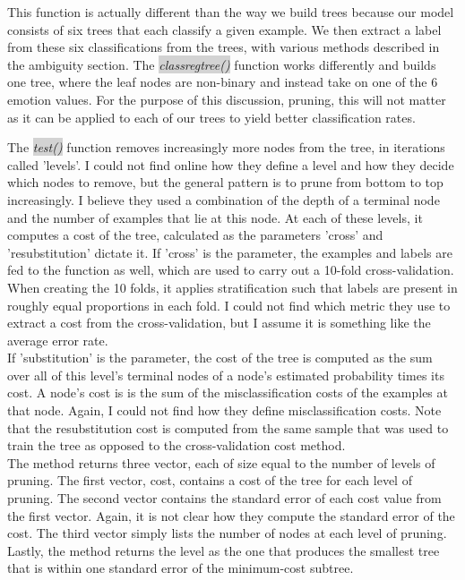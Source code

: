 This function is actually different than the way we build trees because our model consists of six trees that each classify a given
example.
We then extract a label from these six classifications from the trees, with various methods described in the ambiguity section.
The  \colorbox{lightgray}{\emph{classregtree()}} function works differently and builds one tree,
where the leaf nodes are non-binary and instead take on one of the 6 emotion values.
For the purpose of this discussion, pruning,
this will not matter as it can be applied to each of our trees to yield better classification rates.

The  \colorbox{lightgray}{\emph{test()}} function removes increasingly more nodes from the tree, in iterations called 'levels'.
I could not find online how they define a level and how they decide which nodes to remove,
but the general pattern is to prune from bottom to top increasingly.
I believe they used a combination of the depth of a terminal node and the number of examples that lie at this node.
At each of these levels, it computes a cost of the tree, calculated as the parameters 'cross' and 'resubstitution' dictate it.
If 'cross' is the parameter, the examples and labels are fed to the function as well, which are used to carry out a 10-fold
cross-validation. When creating the 10 folds, it applies stratification such that labels are present in roughly equal proportions
in each fold. I could not find which metric they use to extract a cost from the cross-validation, but I assume it is something
like the average error rate.\\
If 'substitution' is the parameter, the cost of the tree is computed as the sum over all of this level's terminal
nodes of a node's estimated probability times its cost.
A node's cost is is the sum of the misclassification costs of the examples at that node.
Again, I could not find how they define misclassification costs.
Note that the resubstitution cost is computed from the same sample that was used to train the tree as opposed to the cross-validation
cost method.\\
The method returns three vector, each of size equal to the number of levels of pruning. The first vector, cost, contains a cost
of the tree for each level of pruning. The second vector contains the standard error of each cost value from the first vector.
Again, it is not clear how they compute the standard error of the cost. The third vector simply lists the number of nodes at each
level of pruning. Lastly, the method returns the level as the one that produces the smallest tree that is within one standard
error of the minimum-cost subtree.

